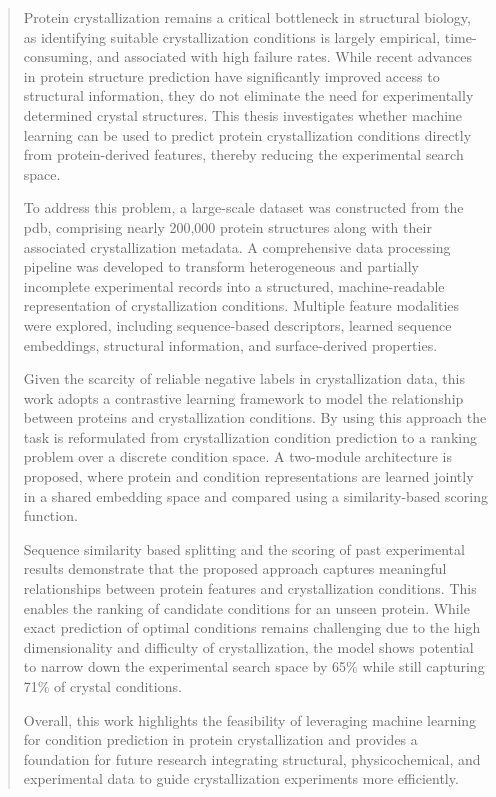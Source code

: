\documentclass[
11pt, %
english, %
singlespacing, %
headsepline, %
]{MasterThesis} %
\begin{document}
\begin{abstract}
\addchaptertocentry{\abstractname} %
Protein crystallization remains a critical bottleneck in structural biology, as identifying suitable crystallization conditions is largely empirical, time-consuming, and associated with high failure rates. While recent advances in protein structure prediction have significantly improved access to structural information, they do not eliminate the need for experimentally determined crystal structures. This thesis investigates whether machine learning can be used to predict protein crystallization conditions directly from protein-derived features, thereby reducing the experimental search space.

To address this problem, a large-scale dataset was constructed from the \gls{pdb}, comprising nearly 200,000 protein structures along with their associated crystallization metadata. A comprehensive data processing pipeline was developed to transform heterogeneous and partially incomplete experimental records into a structured, machine-readable representation of crystallization conditions. Multiple feature modalities were explored, including sequence-based descriptors, learned sequence embeddings, structural information, and surface-derived properties.

Given the scarcity of reliable negative labels in crystallization data, this work adopts a contrastive learning framework to model the relationship between proteins and crystallization conditions. By using this approach the task is reformulated from crystallization condition prediction to a ranking problem over a discrete condition space. A two-module architecture is proposed, where protein and condition representations are learned jointly in a shared embedding space and compared using a similarity-based scoring function. 

Sequence similarity based splitting and the scoring of past experimental results demonstrate that the proposed approach captures meaningful relationships between protein features and crystallization conditions. This enables the ranking of candidate conditions for an unseen protein. While exact prediction of optimal conditions remains challenging due to the high dimensionality and difficulty of crystallization, the model shows potential to narrow down the experimental search space by 65\% while still capturing 71\% of crystal conditions.

Overall, this work highlights the feasibility of leveraging machine learning for condition prediction in protein crystallization and provides a foundation for future research integrating structural, physicochemical, and experimental data to guide crystallization experiments more efficiently.
\end{abstract}
\end{document}
